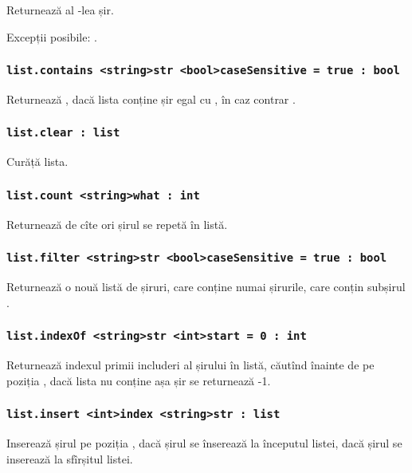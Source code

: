 Returnează al -lea șir.

Excepții posibile: .

\subsubsection{\lstinline|list.contains <string>str <bool>caseSensitive = true : bool|}

Returnează \true, dacă lista conține șir egal cu , în caz contrar \false.

\subsubsection{\lstinline|list.clear : list|}

Curăță lista.

\subsubsection{\lstinline|list.count <string>what : int|}

Returnează de cîte ori șirul  se repetă în listă.

\subsubsection{\lstinline|list.filter <string>str <bool>caseSensitive = true : bool|}

Returnează o nouă listă de șiruri, care conține numai șirurile, care conțin subșirul . 

\subsubsection{\lstinline|list.indexOf <string>str <int>start = 0 : int|}

Returnează indexul primii includeri al șirului  în listă, căutînd înainte de pe poziția , dacă lista nu conține așa șir se returnează -1.

\subsubsection{\lstinline|list.insert <int>index <string>str : list|}

Inserează șirul  pe poziția , dacă  șirul se înserează la începutul listei, dacă  șirul se inserează la sfîrșitul listei.

